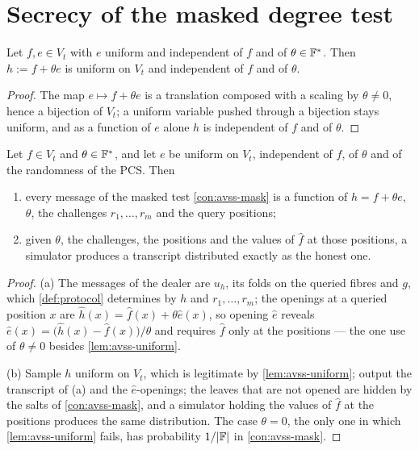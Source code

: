 \section{Secrecy of the masked degree test}

\begin{lemma}\label{lem:avss-uniform}
Let $f,e\in V_t$ with $e$ uniform and independent of $f$ and of $\theta\in\mathbb{F}^*$. Then
$h:=f+\theta e$ is uniform on $V_t$ and independent of $f$ and of $\theta$.
\end{lemma}

\begin{proof}
The map $e\mapsto f+\theta e$ is a translation composed with a scaling by $\theta\ne0$, hence a
bijection of $V_t$; a uniform variable pushed through a bijection stays uniform, and as a function
of $e$ alone $h$ is independent of $f$ and of $\theta$.
\end{proof}

\begin{lemma}[Secrecy]\label{lem:avss-secret}
Let $f\in V_t$ and $\theta\in\mathbb{F}^{*}$, and let $e$ be uniform on $V_t$, independent of $f$, of
$\theta$ and of the randomness of the PCS. Then
\begin{enumerate}
\item[(a)] every message of the masked test \cref{con:avss-mask} is a function of $h=f+\theta e$,
$\theta$, the challenges $r_1,\dots,r_m$ and the query positions;
\item[(b)] given $\theta$, the challenges, the positions and the values of $\hat f$ at those
positions, a simulator produces a transcript distributed exactly as the honest one.
\end{enumerate}
\end{lemma}

\begin{proof}
(a) The messages of the dealer are $u_h$, its folds on the queried fibres and $g$, which
\cref{def:protocol} determines by $h$ and $r_1,\dots,r_m$; the openings at a queried position $x$ are
$\hat h(x)=\hat f(x)+\theta\hat e(x)$, so opening $\hat e$ reveals
$\hat e(x)=\big(\hat h(x)-\hat f(x)\big)/\theta$ and requires $\hat f$ only at the positions --- the
one use of $\theta\ne0$ besides \cref{lem:avss-uniform}.

(b) Sample $h$ uniform on $V_t$, which is legitimate by \cref{lem:avss-uniform}; output the
transcript of (a) and the $\hat e$-openings; the leaves that are not opened are hidden by the salts
of \cref{con:avss-mask}, and a simulator holding the values of $\hat f$ at the positions produces the
same distribution. The case $\theta=0$, the only one in which \cref{lem:avss-uniform} fails, has
probability $1/|\mathbb{F}|$ in \cref{con:avss-mask}.
\end{proof}

